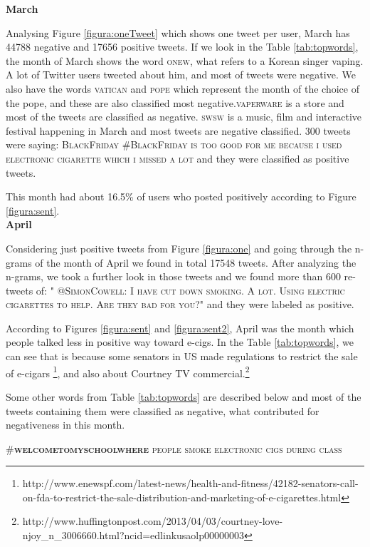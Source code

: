 \documentclass{sig-alternate}
\begin{document}
\textbf{March}

Analysing Figure \ref{figura:oneTweet} which shows one tweet per user, March has 44788 negative and 17656 positive tweets. If we look in the Table \ref{tab:topwords}, the month of March shows the word \textsc{onew}, what refers to a Korean singer vaping. A lot of Twitter users tweeted about him, and most of tweets were negative. We also have the words \textsc{vatican} and \textsc{pope} which represent the month of the choice of the pope, and these are also classified most negative.\textsc{vaperware} is a store and most of the tweets are classified as negative. \textsc{swsw} is a music, film and interactive festival happening in March and most tweets are negative classified. 300 tweets were saying: \textsc{BlackFriday \#BlackFriday  is too good for me because i used electronic cigarette which  i missed a lot} and they were classified as positive tweets.

This month had about 16.5\% of users who posted positively according to Figure \ref{figura:sent}. \\
    
\textbf{April}

 
Considering just positive tweets from Figure \ref{figura:one} and going through the n-grams of the month of April we found in total 17548 tweets. After analyzing the n-grams, we took a further look in those tweets and we found more than 600 re-tweets of: \textsc{" @SimonCowell: I have cut down smoking. A lot. Using electric cigarettes to help. Are they bad for you?"} and they were labeled as positive.

According to Figures \ref{figura:sent} and \ref{figura:sent2}, April was the month which people talked less in positive way toward e-cigs. In the Table \ref{tab:topwords}, we can see that is because some senators in US made regulations to restrict the sale of e-cigars \footnote{http://www.enewspf.com/latest-news/health-and-fitness/42182-senators-call-on-fda-to-restrict-the-sale-distribution-and-marketing-of-e-cigarettes.html}, and also about Courtney TV commercial.\footnote{http://www.huffingtonpost.com/2013/04/03/courtney-love-njoy\_n\_3006660.html?ncid=edlinkusaolp00000003}

Some other words from Table \ref{tab:topwords} are described below and most of the tweets containing them were classified as negative, what contributed for negativeness in this month.

\textsc{\#\textbf{welcometomyschoolwhere} people smoke electronic cigs during class}
\end{document}
